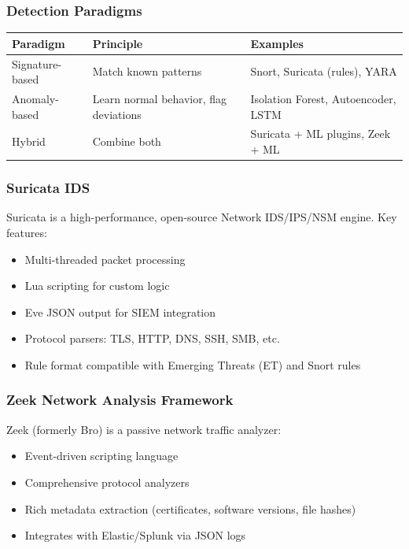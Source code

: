 \documentclass[review]{elsarticle}
\begin{document}
\subsubsection{Detection Paradigms}
\begin{table}[htbp]
\small
\centering
\renewcommand{\arraystretch}{1.2}
\begin{tabular}{|p{2.6cm}|p{4.7cm}|p{3.6cm}|}
\hline
\textbf{Paradigm} & \textbf{Principle} & \textbf{Examples} \\
\hline
Signature-based & Match known patterns & Snort, Suricata (rules), YARA \\
Anomaly-based & Learn normal behavior, flag deviations & Isolation Forest, Autoencoder, LSTM \\
Hybrid & Combine both & Suricata + ML plugins, Zeek + ML \\
\hline
\end{tabular}
\end{table}

\subsubsection{Suricata IDS}
Suricata is a high-performance, open-source Network IDS/IPS/NSM engine. Key features:
\begin{itemize}
\item Multi-threaded packet processing
\item Lua scripting for custom logic
\item Eve JSON output for SIEM integration
\item Protocol parsers: TLS, HTTP, DNS, SSH, SMB, etc.
\item Rule format compatible with Emerging Threats (ET) and Snort rules
\end{itemize}

\subsubsection{Zeek Network Analysis Framework}
Zeek (formerly Bro) is a passive network traffic analyzer:
\begin{itemize}
\item Event-driven scripting language
\item Comprehensive protocol analyzers
\item Rich metadata extraction (certificates, software versions, file hashes)
\item Integrates with Elastic/Splunk via JSON logs
\end{itemize}
\end{document}
